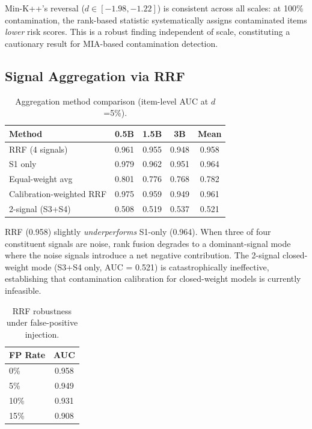 \documentclass[11pt,a4paper]{article}
\begin{document}
Min-K++'s reversal ($d \in [-1.98, -1.22]$) is consistent across all scales: at 100\% contamination, the rank-based statistic systematically assigns contaminated items \emph{lower} risk scores.
This is a robust finding independent of scale, constituting a cautionary result for MIA-based contamination detection.

\subsection{Signal Aggregation via RRF}
\label{sec:rrf}

\begin{table}[h]
\centering
\caption{Aggregation method comparison (item-level AUC at $d$=5\%).}
\label{tab:rrf}
\begin{tabular}{lcccc}
\toprule
Method & 0.5B & 1.5B & 3B & Mean \\
\midrule
RRF (4 signals) & 0.961 & 0.955 & 0.948 & 0.958 \\
S1 only & 0.979 & 0.962 & 0.951 & 0.964 \\
Equal-weight avg & 0.801 & 0.776 & 0.768 & 0.782 \\
Calibration-weighted RRF & 0.975 & 0.959 & 0.949 & 0.961 \\
2-signal (S3+S4) & 0.508 & 0.519 & 0.537 & 0.521 \\
\bottomrule
\end{tabular}
\end{table}

RRF (0.958) slightly \emph{underperforms} S1-only (0.964).
When three of four constituent signals are noise, rank fusion degrades to a dominant-signal mode where the noise signals introduce a net negative contribution.
The 2-signal closed-weight mode (S3+S4 only, AUC = 0.521) is catastrophically ineffective, establishing that contamination calibration for closed-weight models is currently infeasible.

\begin{table}[h]
\centering
\caption{RRF robustness under false-positive injection.}
\label{tab:rrf_fp}
\begin{tabular}{lc}
\toprule
FP Rate & AUC \\
\midrule
0\% & 0.958 \\
5\% & 0.949 \\
10\% & 0.931 \\
15\% & 0.908 \\
\bottomrule
\end{tabular}
\end{table}
\end{document}
